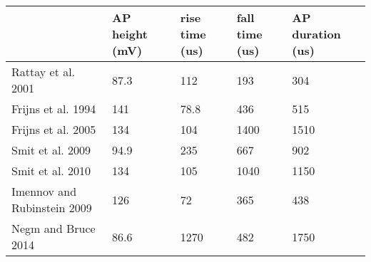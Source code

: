 \begin{tabular}{lllll}
\toprule
{} & AP height (mV) & rise time (us) & fall time (us) & AP duration (us) \\
\midrule
Rattay et al. 2001          &           87.3 &            112 &            193 &              304 \\
Frijns et al. 1994          &            141 &           78.8 &            436 &              515 \\
Frijns et al. 2005          &            134 &            104 &           1400 &             1510 \\
Smit et al. 2009            &           94.9 &            235 &            667 &              902 \\
Smit et al. 2010            &            134 &            105 &           1040 &             1150 \\
Imennov and Rubinstein 2009 &            126 &             72 &            365 &              438 \\
Negm and Bruce 2014         &           86.6 &           1270 &            482 &             1750 \\
\bottomrule
\end{tabular}

